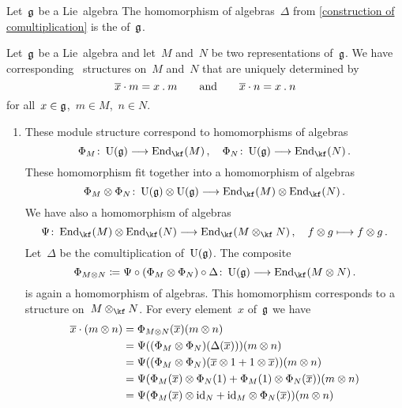 \begin{definition}
	Let~$\mathfrak{g}$ be a Lie~algebra
	The homomorphism of algebras~$\Delta$ from \cref{construction of comultiplication} is the  of~$\mathfrak{g}$.
\end{definition}


\begin{remark}
	Let~$\mathfrak{g}$ be a Lie~algebra and let~$M$ and~$N$ be two representations of~$\mathfrak{g}$.
	We have corresponding~\module{$\Univ(\glie)$} structures on~$M$ and~$N$ that are uniquely determined by
	\[
		\overline{x} \cdot m
		=
		x \mathbin{.} m
		\qquad\text{and}\qquad
		\overline{x} \cdot n
		=
		x \mathbin{.} n
	\]
	for all~$x \in \mathfrak{g}$,~$m \in M$,~$n \in N$.
	\begin{enumerate}
		\item
			These module structure correspond to homomorphisms of algebras
			\[
				\Phi_M
				\colon
				\Univ(\glie)
				\to
				\End_{\kf}(M) \,,
				\quad
				\Phi_N
				\colon
				\Univ(\glie)
				\to
				\End_{\kf}(N) \,.
			\]
			These homomorphism fit together into a homomorphism of algebras
			\[
				\Phi_M \tensor \Phi_N
				\colon
				\Univ(\glie) \tensor \Univ(\glie)
				\to
				\End_{\kf}(M) \tensor \End_{\kf}(N) \,.
			\]
			We have also a homomorphism of algebras
			\[
				\Psi
				\colon
				\End_{\kf}(M) \tensor \End_{\kf}(N)
				\to
				\End_{\kf}(M \tensor_{\kf} N) \,,
				\quad
				f \tensor g
				\mapsto
				f \tensor g \,.
			\]
			Let~$\Delta$ be the comultiplication of~$\Univ(\glie)$.
			The composite
			\[
				\Phi_{M \tensor N}
				\defined
				\Psi \circ (\Phi_M \tensor \Phi_N) \circ \Delta
				\colon
				\Univ(\glie)
				\to
				\End_{\kf}(M \tensor N) \,.
			\]
			is again a homomorphism of algebras.
			This homomorphism corresponds to a~\module{$\Univ(\glie)$} structure on~$M \tensor_{\kf} N$.
			For every element~$x$ of~$\mathfrak{g}$ we have
			\begin{align*}
				\class{x} \cdot (m \tensor n)
				&=
				\Phi_{M \tensor N}( \class{x} )( m \tensor n )
				\\
				&=
				\Psi( (\Phi_M \tensor \Phi_N)( \Delta(\class{x}) ) )( m \tensor n)
				\\
				&=
				\Psi( (\Phi_M \tensor \Phi_N)( \class{x} \tensor 1 + 1 \tensor \class{x} ) )( m \tensor n)
				\\
				&=
				\Psi( \Phi_M(\class{x}) \tensor \Phi_N(1) + \Phi_M(1) \tensor \Phi_N(\class{x}) )( m \tensor n)
				\\
				&=
				\Psi( \Phi_M(\class{x}) \tensor \id_N + \id_M \tensor \Phi_N(\class{x}) )( m \tensor n)

\end{align*}
\end{enumerate}
\end{remark}
